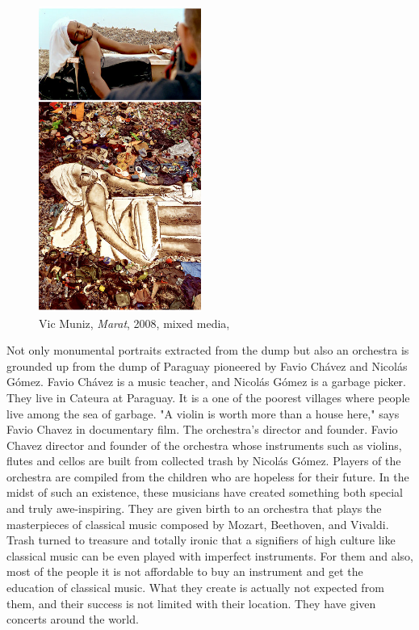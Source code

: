 \begin{figure}[h!]
  \centering
  \includegraphics[height=10cm]{graphics/vik-muniz-picturesofgarbage0.jpg}
  \caption{Vic Muniz, \textit{Marat}, 2008, mixed media, }
  \label{fig:VicMuniz_PicturesOfGarbage}
\end{figure}

Not only monumental portraits extracted from the dump but also an orchestra is grounded up from the dump of Paraguay pioneered by Favio Chávez and Nicolás Gómez. Favio Chávez is a music teacher, and Nicolás Gómez is a garbage picker. They live in Cateura at Paraguay. It is a one of the poorest villages where people live among the sea of garbage. "A violin is worth more than a house here," says Favio Chavez in documentary film. The orchestra's director and founder. Favio Chavez director and founder of the orchestra whose instruments such as violins, flutes and cellos are built from collected trash by Nicolás Gómez. Players of the orchestra are compiled from the children who are hopeless for their future. In the midst of such an existence, these musicians have created something both special and truly awe-inspiring. They are given birth to an orchestra that plays the masterpieces of classical music composed by Mozart, Beethoven, and Vivaldi. Trash turned to treasure and totally ironic that a signifiers of high culture like classical music can be even played with imperfect instruments. For them and also, most of the people it is not affordable to buy an instrument and get the education of classical music. What they create is actually not expected from them, and their success is not limited with their location. They have given concerts around the world. 

